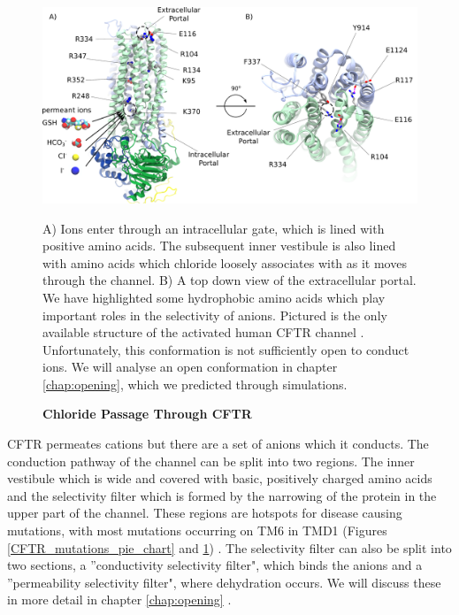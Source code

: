 \begin{figure}
	\begin{center}
	\includegraphics[width=\textwidth]{figures/chloride_passage_figure.pdf}
	\end{center}
	\captionsetup{singlelinecheck = false, justification=raggedright}
	\caption[Chloride Passage through CFTR] {\textbf{Chloride Passage Through CFTR}}{A) Ions enter through an intracellular gate, which is lined with positive amino acids. The subsequent inner vestibule is also lined with amino acids which chloride loosely associates with as it moves through the channel. B) A top down view of the extracellular portal. We have highlighted some hydrophobic amino acids which play important roles in the selectivity of anions. Pictured is the only available structure of the activated human CFTR channel \cite{zhang2018}. Unfortunately, this conformation is not sufficiently open to conduct ions. We will analyse an open conformation in chapter \ref{chap:opening}, which we predicted through simulations.} 
	\label{chloride_passage}

\end{figure}

CFTR permeates cations but there are a set of anions which it conducts. The conduction pathway of the channel can be split into two regions. The inner vestibule which is wide and covered with basic, positively charged amino acids and the selectivity filter which is formed by the narrowing of the protein in the upper part of the channel. These regions are hotspots for disease causing  mutations, with most mutations occurring on TM6 in TMD1 (Figures \ref{CFTR_mutations_pie_chart} and \ref{chloride_passage}) \cite{cftr2}. The selectivity filter can also be split into two sections, a ''conductivity selectivity filter", which binds the anions and a ''permeability selectivity filter", where dehydration occurs. We will discuss these in more detail in chapter \ref{chap:opening} \cite{linsdell2016}. 

